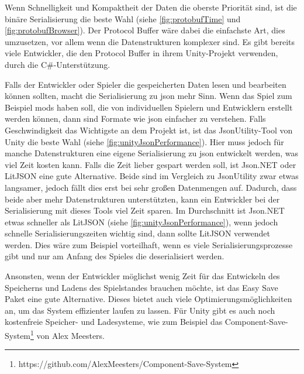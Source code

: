 Wenn Schnelligkeit und Kompaktheit der Daten die oberste Priorität sind, ist die binäre Serialisierung die beste Wahl (siehe \ref{fig:protobufTime} und \ref{fig:protobufBrowser}). Der Protocol Buffer wäre dabei die einfachste Art, dies umzusetzen, vor allem wenn die Datenstrukturen komplexer sind. Es gibt bereits viele Entwickler, die den Protocol Buffer in ihrem Unity-Projekt verwenden, durch die C\#-Unterstützung. 

Falls der Entwickler oder Spieler die gespeicherten Daten lesen und bearbeiten können sollten, macht die Serialisierung zu \ac{json} mehr Sinn. Wenn das Spiel zum Beispiel \acp{mod} haben soll, die von individuellen Spielern und Entwicklern erstellt werden können, dann sind Formate wie \ac{json} einfacher zu verstehen. Falls Geschwindigkeit das Wichtigste an dem Projekt ist, ist das JsonUtility-Tool von Unity die beste Wahl (siehe \ref{fig:unityJsonPerformance}). Hier muss jedoch für manche Datenstrukturen eine eigene Serialisierung zu \ac{json} entwickelt werden, was viel Zeit kosten kann. Falls die Zeit lieber gespart werden soll, ist Json.NET oder LitJSON eine gute Alternative. Beide sind im Vergleich zu JsonUtility zwar etwas langsamer, jedoch fällt dies erst bei sehr großen Datenmengen auf. Dadurch, dass beide aber mehr Datenstrukturen unterstützten, kann ein Entwickler bei der Serialisierung mit dieses Tools viel Zeit sparen. Im Durchschnitt ist Json.NET etwas schneller als LitJSON (siehe \ref{fig:unityJsonPerformance}), wenn jedoch schnelle Serialisierungszeiten wichtig sind, dann sollte LitJSON verwendet werden. Dies wäre zum Beispiel vorteilhaft, wenn es viele Serialisierungsprozesse gibt und nur am Anfang des Spieles die deserialisiert werden.  

Ansonsten, wenn der Entwickler möglichst wenig Zeit für das Entwickeln des Speicherns und Ladens des Spielstandes brauchen möchte, ist das Easy Save Paket eine gute Alternative. Dieses bietet auch viele Optimierungsmöglichkeiten an, um das System effizienter laufen zu lassen. Für Unity gibt es auch noch kostenfreie Speicher- und Ladesysteme, wie zum Beispiel das Component-Save-System\footnote{https://github.com/AlexMeesters/Component-Save-System} von Alex Meesters. 




